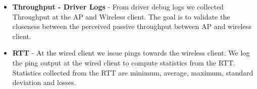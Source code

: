 \begin{itemize}
	\item \textbf{Throughput - Driver Logs} - From driver debug logs we collected Throughput at the AP and Wireless client. The goal is to validate the closeness between the perceived passive throughput between AP and wireless client.
	
	\item \textbf{RTT} - At the wired client we issue pings towards the wireless client. We log the ping output at the wired client to compute statistics from the RTT. Statistics collected from the RTT are minimum, average, maximum, standard deviation and losses.
	
	
		
\end{itemize}
